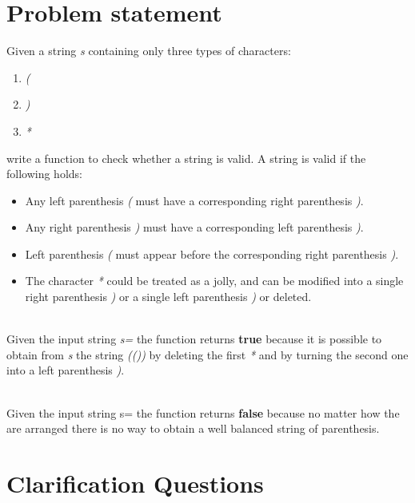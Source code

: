 \section{Problem statement}
\begin{exercise}
 Given a string \textit{s} containing only three types of characters:
 \begin{enumerate}
	 \item \textit{(}
	 \item \textit{)}
	 \item \textit{*}
 \end{enumerate}
 write a function to check whether a string is valid. A string is valid if the following  holds:
  \begin{itemize}
	\item  Any left parenthesis \textit{(} must have a corresponding  right parenthesis \textit{)}.
    \item Any right parenthesis \textit{)}  must have a corresponding left parenthesis \textit{)}.
    \item Left parenthesis \textit{(} must appear before the corresponding right parenthesis \textit{)}.
    \item The character \textit{*} could be treated as a jolly, and can be modified into a single right parenthesis  \textit{)} or a single left parenthesis \textit{)} or deleted.
 \end{itemize}  


	\begin{example}
		\hfill \\
		Given the input string \textit{s=\quotes{(**))}} the function returns \textbf{true} because it is possible to obtain from \textit{s} the string \textit{(())} by deleting the first \textit{*} and by turning the second one into a left parenthesis \textit{)}.
	\end{example}

	\begin{example}
		\hfill \\
		Given the input string s=\textit{\quotes{*(*)()(()}} the function returns \textbf{false} because no matter how the 	\inline{*} are arranged there is no way to obtain a well balanced string of parenthesis.
	\end{example}
\end{exercise}

\section{Clarification Questions}


